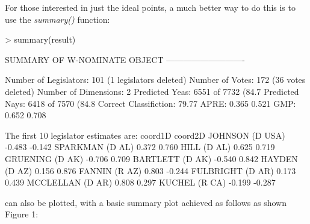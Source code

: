 \documentclass[12pt]{article}
\begin{document}
For those interested in just the ideal points, a much better way
to do this is to use the \emph{summary()} function:

\begin{Schunk}
\begin{Sinput}
> summary(result)
\end{Sinput}
\begin{Soutput}
SUMMARY OF W-NOMINATE OBJECT
----------------------------

Number of Legislators:	  101 (1 legislators deleted)
Number of Votes:	  172 (36 votes deleted)
Number of Dimensions:	  2
Predicted Yeas:		  6551 of 7732 (84.7%
Predicted Nays:		  6418 of 7570 (84.8%
Correct Classifiction:	  79.77%
APRE:			  0.365 0.521
GMP:			  0.652 0.708 


The first 10 legislator estimates are:
                 coord1D coord2D
JOHNSON (D USA)   -0.483  -0.142
SPARKMAN (D AL)    0.372   0.760
HILL (D AL)        0.625   0.719
GRUENING (D AK)   -0.706   0.709
BARTLETT (D AK)   -0.540   0.842
HAYDEN (D AZ)      0.156   0.876
FANNIN (R AZ)      0.803  -0.244
FULBRIGHT (D AR)   0.173   0.439
MCCLELLAN (D AR)   0.808   0.297
KUCHEL (R CA)     -0.199  -0.287
\end{Soutput}
\end{Schunk}

\verb@result@ can also be plotted, with a basic summary plot
achieved as follows as shown Figure 1:
\end{document}
